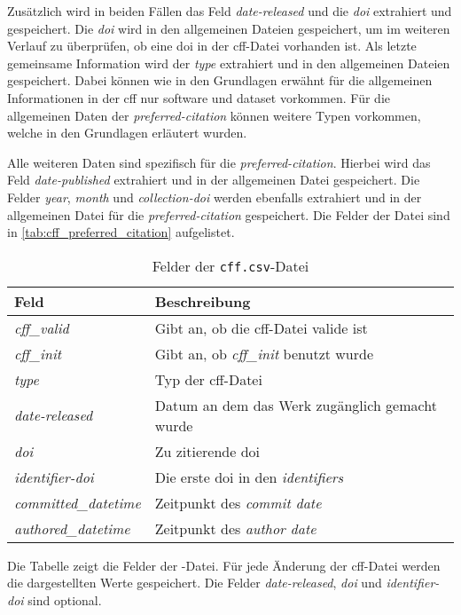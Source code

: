 Zusätzlich wird in beiden Fällen das Feld \emph{date-released} und die \emph{doi} extrahiert und gespeichert.
Die \emph{doi} wird in den allgemeinen Dateien gespeichert, um im weiteren Verlauf zu überprüfen, ob eine \gls{doi} in der \gls{cff}-Datei vorhanden ist.
Als letzte gemeinsame Information wird der \emph{type} extrahiert und in den allgemeinen Dateien gespeichert.
Dabei können wie in den Grundlagen erwähnt für die allgemeinen Informationen in der \gls{cff} nur \glqq software\grqq{} und \glqq dataset\grqq{} vorkommen.
Für die allgemeinen Daten der \emph{preferred-citation} können weitere Typen vorkommen, welche in den Grundlagen erläutert wurden.

Alle weiteren Daten sind spezifisch für die \emph{preferred-citation}.
Hierbei wird das Feld \emph{date-published} extrahiert und in der allgemeinen Datei  gespeichert.
Die Felder \emph{year}, \emph{month} und \emph{collection-doi} werden ebenfalls extrahiert und in der allgemeinen Datei für die \emph{preferred-citation} gespeichert.
Die Felder der Datei sind in \autoref{tab:cff_preferred_citation} aufgelistet.

\begin{table}
    \begin{tabularx}{\textwidth}{XL{10.2cm}}
        \toprule
        \textbf{Feld}              & \textbf{Beschreibung}                               \\ \midrule
        \emph{cff\_valid}          & Gibt an, ob die \gls{cff}-Datei valide ist          \\
        \emph{cff\_init}           & Gibt an, ob \emph{cff\_init} benutzt wurde          \\
        \emph{type}                & Typ der \gls{cff}-Datei                             \\
        \emph{date-released}       & Datum an dem das Werk zugänglich gemacht wurde      \\
        \emph{doi}                 & Zu zitierende \gls{doi}                             \\
        \emph{identifier-doi}      & Die erste \gls{doi} in den \emph{identifiers} \\
        \emph{committed\_datetime} & Zeitpunkt des \emph{commit date}                    \\
        \emph{authored\_datetime}  & Zeitpunkt des \emph{author date}                    \\
        \bottomrule
    \end{tabularx}
    \caption{Felder der \texttt{cff.csv}-Datei}
    \label{tab:cff}
    \small
    Die Tabelle zeigt die Felder der -Datei. Für jede Änderung der \gls{cff}-Datei werden die dargestellten Werte gespeichert. Die Felder \emph{date-released}, \emph{doi} und \emph{identifier-doi} sind optional.
\end{table}

